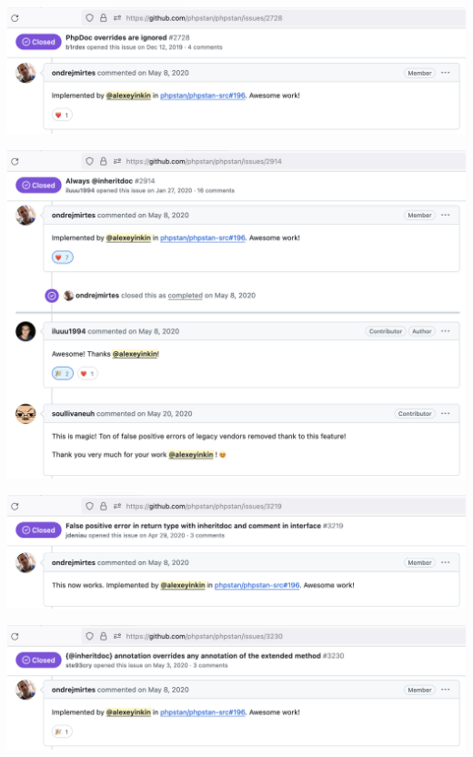 \includegraphics[width=\textwidth]{issue-2728}

\includegraphics[width=\textwidth]{issue-2914}

\includegraphics[width=\textwidth]{issue-3219}
\pagebreak

\includegraphics[width=\textwidth]{issue-3230}

\pagebreak
